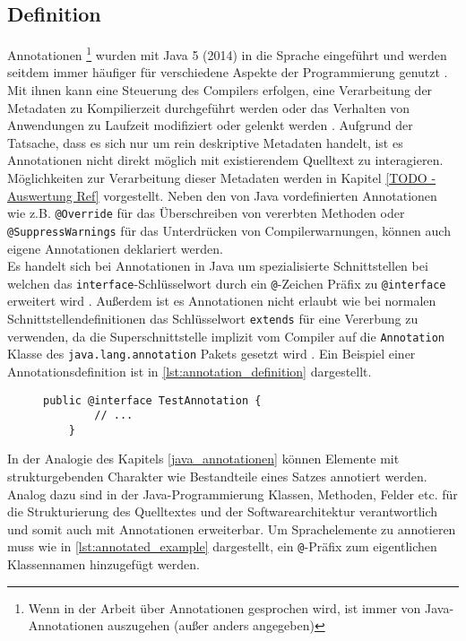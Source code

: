 \subsection{Definition}
\label{java_annotationen_definition}
\noindent Annotationen \footnote{Wenn in der Arbeit über Annotationen gesprochen wird, ist immer von Java-Annotationen auszugehen (außer anders angegeben)} wurden mit Java 5 (2014) in die Sprache eingeführt und werden seitdem immer häufiger für verschiedene Aspekte der Programmierung genutzt \cite{Rocha2011}. Mit ihnen kann eine Steuerung des Compilers erfolgen, eine Verarbeitung der Metadaten zu Kompilierzeit durchgeführt werden oder das Verhalten von Anwendungen zu Laufzeit modifiziert oder gelenkt werden \cite{Yu2019}. Aufgrund der Tatsache, dass es sich nur um rein deskriptive Metadaten handelt, ist es Annotationen nicht direkt möglich mit existierendem Quelltext zu interagieren.  Möglichkeiten zur Verarbeitung dieser Metadaten werden in Kapitel \ref{TODO - Auswertung Ref} vorgestellt. Neben den von Java vordefinierten Annotationen wie z.B. \texttt{@Override} für das Überschreiben von vererbten Methoden oder \texttt{@SuppressWarnings} für das Unterdrücken von Compilerwarnungen, können auch eigene Annotationen deklariert werden.\\
Es handelt sich bei Annotationen in Java um spezialisierte Schnittstellen bei welchen das \texttt{interface}-Schlüsselwort durch ein \texttt{@}-Zeichen Präfix zu \texttt{@interface} erweitert wird \cite{Gosling2005}. Außerdem ist es Annotationen nicht erlaubt wie bei normalen Schnittstellendefinitionen das Schlüsselwort \texttt{extends} für eine Vererbung zu verwenden, da die Superschnittstelle implizit vom Compiler auf die \texttt{Annotation} Klasse des \texttt{java.lang.annotation} Pakets gesetzt wird \cite{Oracle2017}. Ein Beispiel einer  Annotationsdefinition ist in \autoref{lst:annotation_definition} dargestellt.
\begin{figure}[H]
	\centering
	\begin{lstlisting}[caption={Beispiel einer Annotationsdefinition.}, captionpos=b, label=lst:annotation_definition]
	public @interface TestAnnotation {
	    // ...
	}
	\end{lstlisting}
\end{figure}
\noindent In der Analogie des Kapitels \ref{java_annotationen} können Elemente mit strukturgebenden Charakter wie Bestandteile eines Satzes annotiert werden. Analog dazu sind in der Java-Programmierung Klassen, Methoden, Felder etc. für die Strukturierung des Quelltextes und der Softwarearchitektur verantwortlich und somit auch mit Annotationen erweiterbar. Um Sprachelemente zu annotieren muss wie in \autoref{lst:annotated_example} dargestellt, ein \texttt{@}-Präfix zum eigentlichen Klassennamen hinzugefügt werden.
